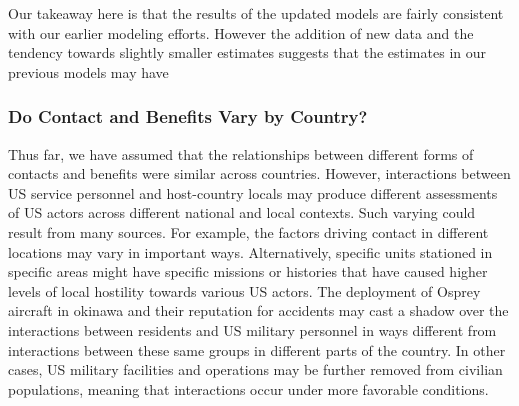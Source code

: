 Our takeaway here is that the results of the updated models are fairly consistent with our earlier modeling efforts. However the addition of new data and the tendency towards slightly smaller estimates suggests that the estimates in our previous models may have 

\subsubsection*{Do Contact and Benefits Vary by Country?}

Thus far, we have assumed that the relationships between different forms of contacts and benefits were similar across countries. However, interactions between US service personnel and host-country locals may produce different assessments of US actors across different national and local contexts. Such varying could result from many sources. For example, the factors driving contact in different locations may vary in important ways. Alternatively, specific units stationed in specific areas might have specific missions or histories that have caused higher levels of local hostility towards various US actors. The deployment of Osprey aircraft in okinawa and their reputation for accidents may cast a shadow over the interactions between residents and US military personnel in ways different from interactions between these same groups in different parts of the country. In other cases, US military facilities and operations may be further removed from civilian populations, meaning that interactions occur under more favorable conditions. 

